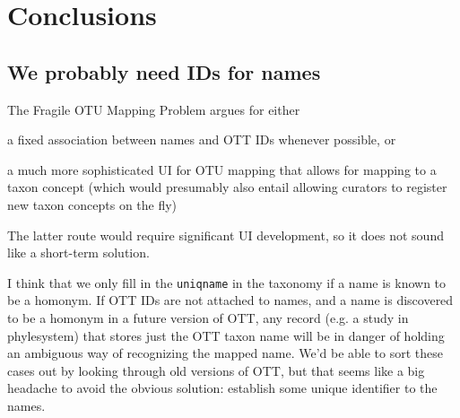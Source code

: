 \documentclass[11pt]{article}
\newcommand{\fragileOTUMapping}{Fragile OTU Mapping Problem\xspace}
\begin{document}
\section{Conclusions}
\subsection{We probably need IDs for names}
The \fragileOTUMapping argues for either
\begin{compactenum}
  \item a fixed association between names and OTT IDs whenever possible, or
  \item a much more sophisticated UI for OTU mapping that allows for mapping
    to a taxon concept (which would presumably also entail allowing curators to
    register new taxon concepts on the fly)
\end{compactenum}
The latter route would require significant UI development, so 
  it does not sound like a short-term solution.

I think that we only fill in the {\tt uniqname} in the taxonomy if 
  a name is known to be a homonym.
If OTT IDs are not attached to names, and a name is discovered to be a homonym
  in a future version of OTT,
  any record (e.g. a study in phylesystem) that stores just the OTT
  taxon name will be in danger of holding an ambiguous way of recognizing the
  mapped name.
We'd be able to sort these cases out by looking through old versions of OTT, but
  that seems like a big headache to avoid the obvious solution: establish some
  unique identifier to the names.


\end{document}
